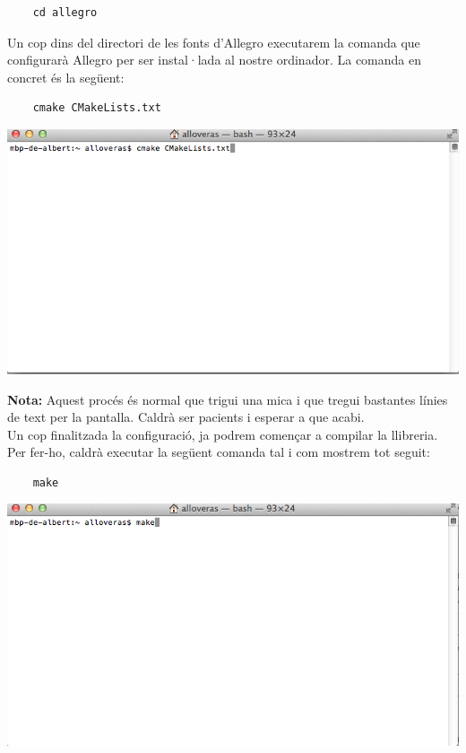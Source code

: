 \documentclass[11pt]{article}
\begin{document}
\begin{verbatim}
	cd allegro
\end{verbatim}

\noindent Un cop dins del directori de les fonts d'Allegro executarem la comanda que configurarà Allegro per ser instal·lada al nostre ordinador. La comanda en concret és la següent:

\begin{verbatim}
	cmake CMakeLists.txt
\end{verbatim}

\begin{center}
	\includegraphics[scale=0.5]{img/Configure.png}
\end{center}

\noindent \textbf{Nota:} Aquest procés és normal que trigui una mica i que tregui bastantes línies de text per la pantalla. Caldrà ser pacients i esperar a que acabi.\\

\newpage
\noindent Un cop finalitzada la configuració, ja podrem començar a compilar la llibreria. Per fer-ho, caldrà executar la següent comanda tal i com mostrem tot seguit:

\begin{verbatim}
	make
\end{verbatim}

\begin{center}
		\includegraphics[scale=0.5]{img/Make.png}
\end{center}
\end{document}
